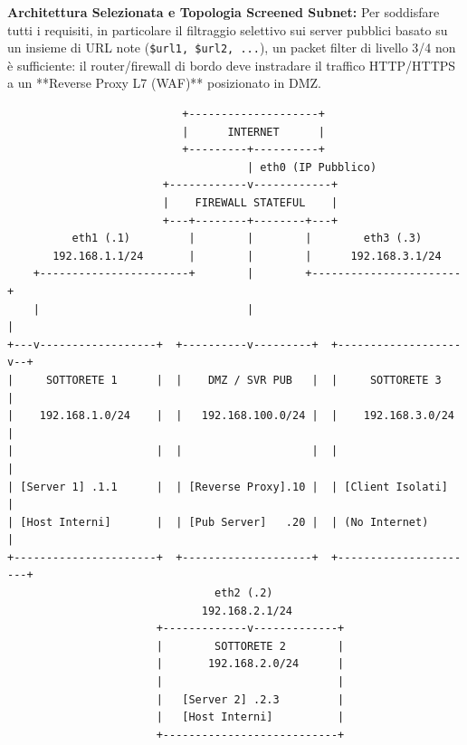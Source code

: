 \documentclass[11pt,a4paper]{article}
\begin{document}
\begin{solutionbox}
\textbf{Architettura Selezionata e Topologia Screened Subnet:}
Per soddisfare tutti i requisiti, in particolare il filtraggio selettivo sui server pubblici basato su un insieme di URL note (\texttt{\$url1, \$url2, ...}), un packet filter di livello 3/4 non \`e sufficiente: il router/firewall di bordo deve instradare il traffico HTTP/HTTPS a un **Reverse Proxy L7 (WAF)** posizionato in DMZ.
\begin{center}
\begin{verbatim}
                           +--------------------+
                           |      INTERNET      |
                           +---------+----------+
                                     | eth0 (IP Pubblico)
                        +------------v------------+
                        |    FIREWALL STATEFUL    |
                        +---+--------+--------+---+
          eth1 (.1)         |        |        |        eth3 (.3)
       192.168.1.1/24       |        |        |      192.168.3.1/24
    +-----------------------+        |        +-----------------------+
    |                                |                                |
+---v------------------+  +----------v---------+  +-------------------v--+
|     SOTTORETE 1      |  |    DMZ / SVR PUB   |  |     SOTTORETE 3      |
|    192.168.1.0/24    |  |   192.168.100.0/24 |  |    192.168.3.0/24    |
|                      |  |                    |  |                      |
| [Server 1] .1.1      |  | [Reverse Proxy].10 |  | [Client Isolati]     |
| [Host Interni]       |  | [Pub Server]   .20 |  | (No Internet)        |
+----------------------+  +--------------------+  +----------------------+
                                eth2 (.2)
                              192.168.2.1/24
                       +-------------v-------------+
                       |        SOTTORETE 2        |
                       |       192.168.2.0/24      |
                       |                           |
                       |   [Server 2] .2.3         |
                       |   [Host Interni]          |
                       +---------------------------+
\end{verbatim}
\end{center}


\end{solutionbox}
\end{document}
